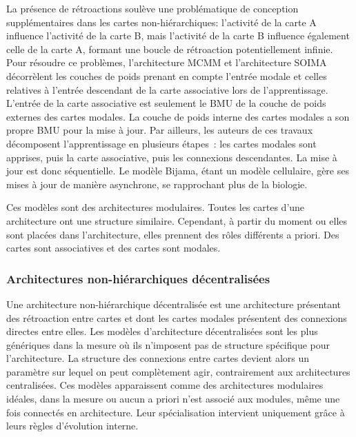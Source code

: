 \documentclass[../main]{subfiles}
\begin{document}
{La présence de rétroactions soulève une problématique de conception supplémentaires dans les cartes non-hiérarchiques: l'activité de la carte A influence l'activité de la carte B, mais l'activité de la carte B influence également celle de la carte A, formant une boucle de rétroaction potentiellement infinie. 
Pour résoudre ce problèmes, l'architecture MCMM et l'architecture SOIMA décorrèlent les couches de poids prenant en compte l'entrée modale et celles relatives à l'entrée descendant de la carte associative lors de l'apprentissage.
L'entrée de la carte associative est seulement le BMU de la couche de poids externes des cartes modales. La couche de poids interne des cartes modales a son propre BMU pour la mise à jour. 
Par ailleurs, les auteurs de ces travaux décomposent l'apprentissage en plusieurs étapes~: les cartes modales sont apprises, puis la carte associative, puis les connexions descendantes. La mise à jour est donc séquentielle.
Le modèle Bijama, étant un modèle cellulaire, gère ses mises à jour de manière asynchrone, se rapprochant plus de la biologie.

Ces modèles sont des architectures modulaires. Toutes les cartes d'une architecture ont une structure similaire. Cependant, à partir du moment ou elles sont placées dans l'architecture, elles prennent des rôles différents a priori. Des cartes sont associatives et des cartes sont modales. 

\subsubsection{Architectures non-hiérarchiques décentralisées}

Une architecture non-hiérarchique décentralisée est une architecture présentant des rétroaction entre cartes et dont les cartes modales présentent des connexions directes entre elles.
Les modèles d'architecture décentralisées sont les plus génériques dans la mesure où ils n'imposent pas de structure spécifique pour l'architecture.
La structure des connexions entre cartes devient alors un paramètre sur lequel on peut complètement agir, contrairement aux architectures centralisées. 
Ces modèles apparaissent comme des architectures modulaires idéales, dans la mesure ou aucun a priori n'est associé aux modules, même une fois connectés en architecture. Leur spécialisation intervient uniquement grâce à leurs règles d'évolution interne.

}
\end{document}
